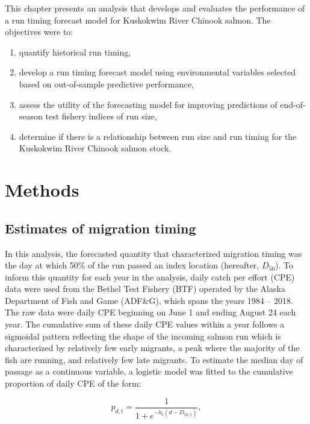\documentclass[12pt,]{book}
\providecommand{\tightlist}{%
  \setlength{\itemsep}{0pt}\setlength{\parskip}{0pt}}
\theoremstyle{definition}
\theoremstyle{definition}
\theoremstyle{definition}
\theoremstyle{remark}
\begin{document}
This chapter presents an analysis that develops and evaluates the
performance of a run timing forecast model for Kuskokwim River Chinook
salmon. The objectives were to:

\begin{enumerate}
\def\labelenumi{(\arabic{enumi})}
\tightlist
\item
  quantify historical run timing,
\item
  develop a run timing forecast model using environmental variables
  selected based on out-of-sample predictive performance,
\item
  assess the utility of the forecasting model for improving predictions
  of end-of-season test fishery indices of run size,
\item
  determine if there is a relationship between run size and run timing
  for the Kuskokwim River Chinook salmon stock.
\end{enumerate}

\section{Methods}\label{methods}

\subsection{Estimates of migration
timing}\label{estimates-of-migration-timing}

\noindent
In this analysis, the forecasted quantity that characterized migration
timing was the day at which 50\% of the run passed an index location
(hereafter, \(D_{50}\)). To inform this quantity for each year in the
analysis, daily catch per effort (CPE) data were used from the Bethel
Test Fishery (BTF) operated by the Alaska Department of Fish and Game
(ADF\&G), which spans the years 1984 -- 2018. The raw data were daily
CPE beginning on June 1 and ending August 24 each year. The cumulative
sum of these daily CPE values within a year follows a sigmoidal pattern
reflecting the shape of the incoming salmon run which is characterized
by relatively few early migrants, a peak where the majority of the fish
are running, and relatively few late migrants. To estimate the median
day of passage as a continuous variable, a logistic model was fitted to
the cumulative proportion of daily CPE of the form:

\begin{equation}
  p_{d,t}=\frac{1}{1 + e^{-h_t (d - D_{50,t})}},
  \label{eq:logistic}
\end{equation}
\end{document}

